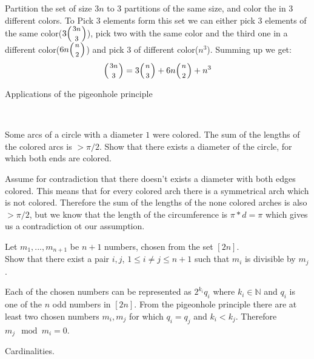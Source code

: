 \documentclass[a4paper,11pt]{exam}
\renewcommand{\binom}{\mbinom}
\newcommand{\N}{\mathbb{N}}
\begin{document}
\begin{questions}
  \begin{solution}
  	Partition the set of size $3n$ to 3 partitions of the same size, and color the in 3 different colors.
  	To Pick 3 elements form this set we can either pick 3 elements of the same color($3\binom{3n}{3}$), pick two with the same color and the third one in a different color($ 6n\binom{n}{2} $) and pick 3 of different color($n^3$). Summing up we get:
  	 \[
  		\binom{3n}{3} = 3\binom{n}{3} + 6n\binom{n}{2} + n^3
  	\]
  \end{solution}

  \vspace{0.6cm}
\colorbox{gris}{
	\begin{minipage}[c]{\textwidth}
		Applications of the pigeonhole principle 
	\end{minipage}
}~
\vspace{-0.1cm}

  \question
  Some arcs of a circle with a diameter $1$ were colored. The sum of the lengths of the colored arcs is $>\pi/2$.
  Show that there exists a diameter of the circle, for which both ends are colored.

  \begin{solution}
  	Assume for contradiction that there doesn't exists a diameter with both edges colored.
  	This means that for every colored arch there is a symmetrical arch which is not colored. Therefore the sum of the lengths of the none colored arches is also $>\pi/2$, but we know that the length of the circumference is $\pi*d = \pi$ which gives us a contradiction ot our assumption.

  \end{solution}


  \question
  Let $m_1,...,m_{n+1}$ be $n+1$ numbers, chosen from the set $[2n]$.\\
  Show that there exist a pair $i,j$, $1 \leq i \neq j \leq n+1$ such that $m_i$ is divisible by
  $m_j$.

  \begin{solution}
  	Each of the chosen numbers can be represented as $2^{k_i} q_i$ where $k_i\in\N$ and $q_i$ is one of the $n$ odd numbers in $[2n]$. From the pigeonhole principle there are at least two chosen numbers $m_i,m_j$ for which $q_i=q_j$ and $k_i<k_j$. Therefore $m_j \mod m_i = 0$.
  \end{solution}

  \vspace{0.8cm}
  \colorbox{gris}{
    \begin{minipage}[c]{\textwidth}
       Cardinalities. 
    \end{minipage}
  }~
  \vspace{-0.1cm}


\end{questions}
\end{document}

